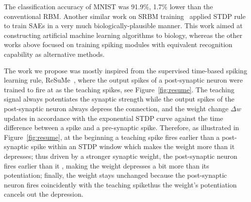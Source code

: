 The classification accuracy of MNIST was 91.9\%, 1.7\% lower than the conventional RBM.
Another similar work on SRBM training~\citep{burbank2015mirrored} applied \DIFaddbegin {}\DIFaddend STDP rule to train SAEs in a very much biologically-plausible manner.
This work aimed at constructing artificial machine learning algorithms \DIFdelbegin {}\DIFdelend \DIFaddbegin {}\DIFaddend to biology, whereas the other works above focused on training spiking \DIFdelbegin {}\DIFdelend \DIFaddbegin {}\DIFaddend modules with equivalent recognition capability as alternative \DIFdelbegin {}\DIFdelend \DIFaddbegin {}\DIFaddend methods.

The work we propose was mostly inspired from the supervised time-based spiking learning rule, ReSuMe~\citep{ponulak2010supervised}, where the output spikes of a post-synaptic neuron were trained to fire at \DIFdelbegin {}\DIFdelend \DIFaddbegin {}\DIFaddend as the teaching spikes\DIFdelbegin {}\DIFdelend , see Figure~\ref{fig:resume}.
The teaching signal always potentiates the synaptic strength while the output spikes of the post-synaptic neuron always depress the connection, and the weight change $\Delta w$ updates in accordance with the exponential STDP curve against the time difference between a spike and a pre-synaptic spike.
Therefore, as illustrated in Figure~\ref{fig:resume}, at the beginning a teaching spike fires earlier than a post-synaptic spike within an STDP window which makes the weight \DIFdelbegin {}\DIFdelend \DIFaddbegin {}\DIFaddend more than it depresses;
thus driven by a stronger synaptic weight, the post-synaptic neuron fires earlier than it \DIFdelbegin {}\DIFdelend \DIFaddbegin {}\DIFaddend , making the weight depresses a bit more than its potentiation;
finally, the weight stays unchanged because the post-synaptic neuron fires coincidently with the teaching spike\DIFaddbegin \DIFadd{, }\DIFaddend thus the weight's potentiation cancels out the depression.
